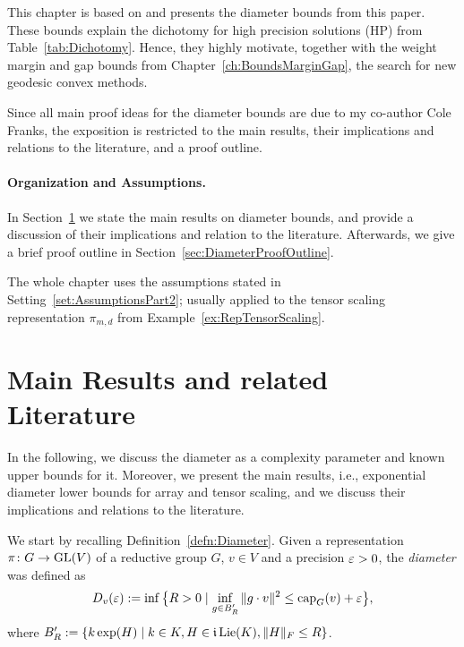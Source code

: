 

This chapter is based on \cite{WeightMargin} and presents the diameter bounds from this paper. These bounds explain the dichotomy for high precision solutions (HP) from Table~\ref{tab:Dichotomy}. Hence, they highly motivate, together with the weight margin and gap bounds from Chapter~\ref{ch:BoundsMarginGap}, the search for new geodesic convex methods.

Since all main proof ideas for the diameter bounds are due to my co-author Cole Franks, the exposition is restricted to the main results, their implications and relations to the literature, and a proof outline.

\paragraph{Organization and Assumptions.}
In Section~\ref{sec:DiameterComplexity} we state the main results on diameter bounds, and provide a discussion of their implications and relation to the literature. Afterwards, we give a brief proof outline in Section~\ref{sec:DiameterProofOutline}.

The whole chapter uses the assumptions stated in Setting~\ref{set:AssumptionsPart2}; usually applied to the tensor scaling representation $\pi_{m,d}$ from Example~\ref{ex:RepTensorScaling}.



\section{Main Results and related Literature} \label{sec:DiameterComplexity}

In the following, we discuss the diameter as a complexity parameter and known upper bounds for it. Moreover, we present the main results, i.e., exponential diameter lower bounds for array and tensor scaling, and we discuss their implications and relations to the literature.

We start by recalling Definition~\ref{defn:Diameter}. Given a representation $\pi \colon G \to \operatorname{GL}(V)$ of a reductive group $G$, $v \in V$ and a precision $\varepsilon > 0$, the \emph{diameter} was defined as
	\[ D_v(\varepsilon) := \inf \big\{ R > 0 \mid \inf_{g \in B'_R} \|g \cdot v\|^2 \leq \operatorname{cap}_G(v) + \varepsilon \big\}, \]
where $B'_R := \{ k \exp(H) \mid k \in K, H \in \mathfrak{i} \operatorname{Lie}(K), \|H\|_F \leq R \}$.

